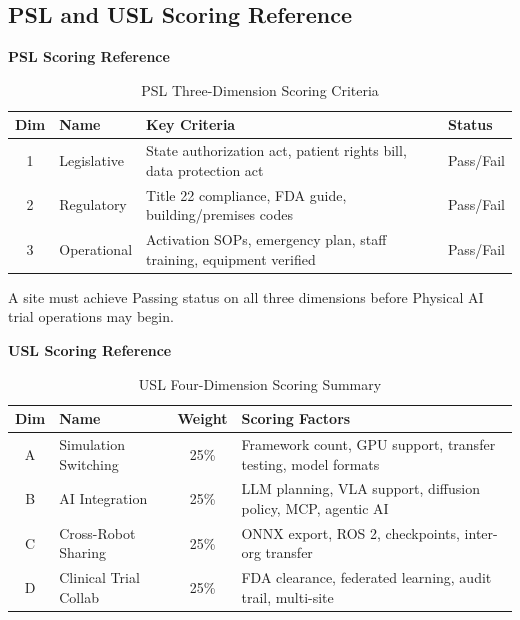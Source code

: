 \newpage

\subsection{PSL and USL Scoring Reference}
\label{app:scoring}

\noindent\textbf{PSL Scoring Reference}

\begin{table}[H]
\centering
\caption{PSL Three-Dimension Scoring Criteria}
\label{tab:psl-scoring}
\small
\begin{tabularx}{\textwidth}{c l X l}
\toprule
\textbf{Dim} & \textbf{Name} & \textbf{Key Criteria} & \textbf{Status} \\
\midrule
1 & Legislative & State authorization act, patient rights bill, data protection act & Pass/Fail \\
2 & Regulatory & Title 22 compliance, FDA guide, building/premises codes & Pass/Fail \\
3 & Operational & Activation SOPs, emergency plan, staff training, equipment verified & Pass/Fail \\
\bottomrule
\end{tabularx}
\end{table}

\noindent A site must achieve Passing status on all three dimensions before
Physical AI trial operations may begin.

\vspace{0.5cm}

\noindent\textbf{USL Scoring Reference}

\begin{table}[H]
\centering
\caption{USL Four-Dimension Scoring Summary}
\label{tab:usl-scoring}
\small
\begin{tabularx}{\textwidth}{c l c X}
\toprule
\textbf{Dim} & \textbf{Name} & \textbf{Weight} & \textbf{Scoring Factors} \\
\midrule
A & Simulation Switching & 25\% & Framework count, GPU support, transfer testing, model formats \\
B & AI Integration & 25\% & LLM planning, VLA support, diffusion policy, MCP, agentic AI \\
C & Cross-Robot Sharing & 25\% & ONNX export, ROS 2, checkpoints, inter-org transfer \\
D & Clinical Trial Collab & 25\% & FDA clearance, federated learning, audit trail, multi-site \\
\bottomrule
\end{tabularx}
\end{table}

